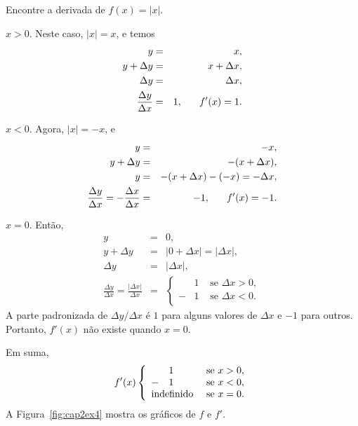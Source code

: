 \begin{example}
Encontre a derivada de $f(x) = |x|$.

\begin{caseanalysis}
\item $x > 0$. Neste caso, $|x| = x$, e temos
      \begin{eqnarray*}
        y & = & x, \\
        y + \Delta{y} & = & x + \Delta{x}, \\
        \Delta{y} & = & \Delta{x}, \\
        \frac{\Delta{y}}{\Delta{x}} & = & 1, \hspace{4ex} f'(x) = 1.
      \end{eqnarray*}
\item $x < 0$. Agora, $|x| = -x$, e
      \begin{eqnarray*}
        y & = & -x, \\
        y + \Delta{y} & = & -(x + \Delta{x}), \\
        y & = & -(x + \Delta{x}) - (-x) = -\Delta{x}, \\
        \frac{\Delta{y}}{\Delta{x}} = -\frac{\Delta{x}}{\Delta{x}}
          & = & -1, \hspace{4ex} f'(x) = -1.
      \end{eqnarray*}
\item $x = 0$. Então,
      \begin{eqnarray*}
        y & = & 0, \\
        y + \Delta{y} & = & |0 + \Delta{x}| = |\Delta{x}|, \\
        \Delta{y} & = & |\Delta{x}|, \\
        \frac{\Delta{y}}{\Delta{x}} = \frac{|\Delta{x}|}{\Delta{x}}
          & = & \left\{
                  \begin{array}{lll}
                      & 1 & \text{ se } \Delta{x} > 0, \\
                    - & 1 & \text{ se } \Delta{x} < 0. \\
                  \end{array}
                \right.
      \end{eqnarray*}
      A parte padronizada de $\Delta{y}/\Delta{x}$ é $1$ para alguns
      valores de $\Delta{x}$ e $-1$ para outros. Portanto, $f'(x)$ não
      existe quando $x = 0$.

      Em suma,
      $$
        f'(x) \left\{
          \begin{array}{rll}
               & 1 & \text{ se } x > 0, \\
             - & 1 & \text{ se } x < 0, \\
             \multicolumn{2}{l}{\text{indefinido}} & \text{ se } x = 0.
          \end{array}
        \right.
      $$
      A Figura~\ref{fig:cap2ex4} mostra os gráficos de $f$ e $f'$.
\end{caseanalysis}
\end{example}

